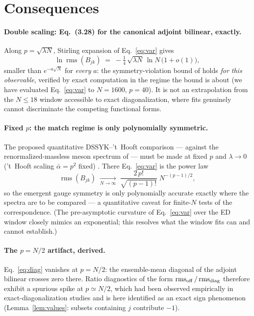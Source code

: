 \documentclass[11pt]{article}
\newcommand{\rms}{\operatorname{rms}}
\begin{document}
\section{Consequences}

\paragraph{Double scaling: Eq.~(3.28) for the canonical adjoint bilinear, exactly.}
Along $p=\sqrt{\lambda N}$, Stirling expansion of Eq.~\eqref{eq:var} gives
\begin{equation}
\ln\rms(B_{jk})\;=\;-\tfrac14\,\sqrt{\lambda N}\,\ln N\,\bigl(1+o(1)\bigr),
\end{equation}
smaller than $e^{-a\sqrt N}$ for \emph{every} $a$: the symmetry-violation
bound of \cite{MSS2607} holds \emph{for this observable}, verified by exact
computation in the regime the bound is about (we have evaluated Eq.~\eqref{eq:var} to $N=1600$, $p=40$).
It is not an extrapolation from the $N\le18$ window accessible to exact
diagonalization, where fits genuinely cannot discriminate the competing
functional forms.

\paragraph{Fixed $p$: the match regime is only polynomially symmetric.}
The proposed quantitative DSSYK--'t~Hooft comparison --- against the
renormalized-massless meson spectrum of \cite{FLZ} --- must be made at fixed
$p$ and $\lambda\to0$ ('t~Hooft scaling $\bar\alpha=p^2$ fixed)
\cite{MSS2506,MSS2607}. There Eq.~\eqref{eq:var} is the power law
\begin{equation}
\rms(B_{jk})\;\xrightarrow[N\to\infty]{}\;
\frac{2\,p!}{\sqrt{(p-1)!}}\;N^{-(p-1)/2},
\end{equation}
so the emergent gauge symmetry is only polynomially accurate exactly where the
spectra are to be compared --- a quantitative caveat for finite-$N$ tests of
the correspondence. (The pre-asymptotic curvature of Eq.~\eqref{eq:var} over
the ED window closely mimics an exponential; this resolves what the window
fits can and cannot establish.)

\paragraph{The $p=N/2$ artifact, derived.}
Eq.~\eqref{eq:diag} vanishes at $p=N/2$: the ensemble-mean diagonal of the
adjoint bilinear crosses zero there. Ratio diagnostics of the form
$\rms_{\rm off}/\rms_{\rm diag}$ therefore exhibit a spurious spike at
$p\simeq N/2$, which had been observed empirically in exact-diagonalization
studies and is here identified as an exact sign phenomenon
(Lemma~\ref{lem:values}: subsets containing $j$ contribute $-1$).
\end{document}
